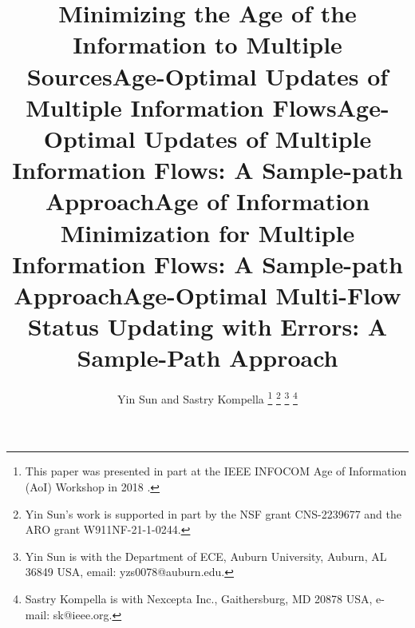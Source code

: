 \documentclass[journal]{IEEEtran}
\theoremstyle{definition}
\begin{document}
\IEEEoverridecommandlockouts
\title{Minimizing the Age of the Information to Multiple Sources}
\title{\huge	 Age-Optimal Updates of Multiple Information Flows}
\title{\huge	 Age-Optimal Updates of Multiple Information Flows: A Sample-path Approach}
\title{Age of Information Minimization for Multiple Information Flows: A Sample-path Approach}
\title{Age-Optimal Multi-Flow Status Updating with Errors: A Sample-Path Approach}


\author{Yin Sun and Sastry Kompella %
\thanks{This paper was presented in part at the IEEE INFOCOM Age of Information (AoI) Workshop in 2018 \cite{SunAoIWorkshop2018}.}
\thanks{Yin Sun's work is supported in part by the NSF grant CNS-2239677 and the ARO grant W911NF-21-1-0244.}
\thanks{Yin Sun is with the Department of ECE, Auburn University, Auburn, AL 36849 USA, email: yzs0078@auburn.edu.}
\thanks{Sastry Kompella is with Nexcepta Inc., Gaithersburg, MD 20878 USA, e-mail: sk@ieee.org.}

}

\maketitle
\thispagestyle{plain}
\pagestyle{plain}



%

%
%



\end{document}
